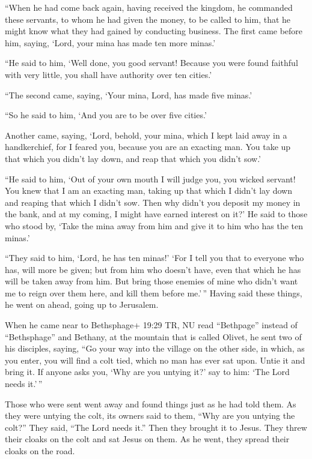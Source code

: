  ``When he had come back again, having received the
kingdom, he commanded these servants, to whom he had given the money, to
be called to him, that he might know what they had gained by conducting
business.  The first came before him, saying, `Lord, your
mina has made ten more minas.'

 ``He said to him, `Well done, you good servant! Because
you were found faithful with very little, you shall have authority over
ten cities.'

 ``The second came, saying, `Your mina, Lord, has made five
minas.'

 ``So he said to him, `And you are to be over five cities.'

 Another came, saying, `Lord, behold, your mina, which I
kept laid away in a handkerchief,  for I feared you,
because you are an exacting man. You take up that which you didn't lay
down, and reap that which you didn't sow.'

 ``He said to him, `Out of your own mouth I will judge you,
you wicked servant! You knew that I am an exacting man, taking up that
which I didn't lay down and reaping that which I didn't sow.
 Then why didn't you deposit my money in the bank, and at
my coming, I might have earned interest on it?'  He said to
those who stood by, `Take the mina away from him and give it to him who
has the ten minas.'

 ``They said to him, `Lord, he has ten minas!'
 `For I tell you that to everyone who has, will more be
given; but from him who doesn't have, even that which he has will be
taken away from him.  But bring those enemies of mine who
didn't want me to reign over them here, and kill them before me.'\,''
 Having said these things, he went on ahead, going up to
Jerusalem.

 When he came near to Bethsphage+ 19:29 TR, NU read
``Bethpage'' instead of ``Bethsphage'' and Bethany, at the mountain that
is called Olivet, he sent two of his disciples,  saying,
``Go your way into the village on the other side, in which, as you
enter, you will find a colt tied, which no man has ever sat upon. Untie
it and bring it.  If anyone asks you, `Why are you untying
it?' say to him: `The Lord needs it.'\,''

 Those who were sent went away and found things just as he
had told them.  As they were untying the colt, its owners
said to them, ``Why are you untying the colt?''  They said,
``The Lord needs it.''  Then they brought it to Jesus. They
threw their cloaks on the colt and sat Jesus on them.  As
he went, they spread their cloaks on the road.


